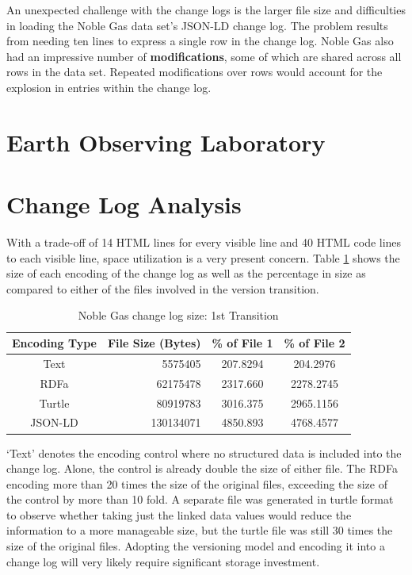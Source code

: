 An unexpected challenge with the change logs is the larger file size and difficulties in loading the Noble Gas data set's JSON-LD change log.
The problem results from needing ten lines to express a single row in the change log.
Noble Gas also had an impressive number of \textbf{modifications}, some of which are shared across all rows in the data set.
Repeated modifications over rows would account for the explosion in entries within the change log.

\section{Earth Observing Laboratory}



\section{Change Log Analysis}

With a trade-off of 14 HTML lines for every visible line and 40 HTML code lines to each visible line, space utilization is a very present concern.
Table \ref{table:Ng_changelog_table1} shows the size of each encoding of the change log as well as the percentage in size as compared to either of the files involved in the version transition.
\begin{table}
	\caption{Noble Gas change log size: 1st Transition}
	\label{table:Ng_changelog_table1}
	\centering
	\begin{tabular}{|c|r|c|c|}
		\hline
		Encoding Type & File Size (Bytes) & \% of File 1 & \% of File 2 \\
		\hline
		Text&	5575405&	207.8294&	204.2976\\
		RDFa&	62175478&	2317.660&	2278.2745\\
		Turtle&	80919783&	3016.375&	2965.1156\\
		JSON-LD&	130134071&	4850.893&	4768.4577\\
		\hline
	\end{tabular}
\end{table}
`Text' denotes the encoding control where no structured data is included into the change log.
Alone, the control is already double the size of either file.
The RDFa encoding more than 20 times the size of the original files, exceeding the size of the control by more than 10 fold.
A separate file was generated in turtle format to observe whether taking just the linked data values would reduce the information to a more manageable size, but the turtle file was still 30 times the size of the original files.
Adopting the versioning model and encoding it into a change log will very likely require significant storage investment.

